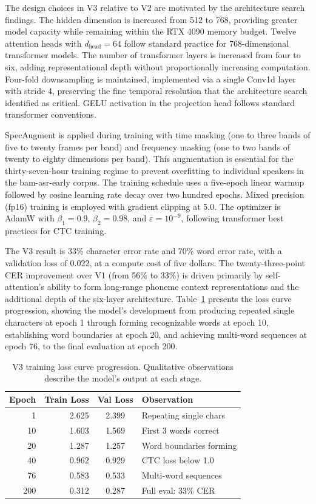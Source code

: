 \documentclass[11pt]{article}
\begin{document}
The design choices in V3 relative to V2 are motivated by the architecture search findings. The hidden dimension is increased from 512 to 768, providing greater model capacity while remaining within the RTX 4090 memory budget. Twelve attention heads with $d_{\text{head}} = 64$ follow standard practice for 768-dimensional transformer models. The number of transformer layers is increased from four to six, adding representational depth without proportionally increasing computation. Four-fold downsampling is maintained, implemented via a single Conv1d layer with stride 4, preserving the fine temporal resolution that the architecture search identified as critical. GELU activation in the projection head follows standard transformer conventions.

SpecAugment \cite{park2019specaugment} is applied during training with time masking (one to three bands of five to twenty frames per band) and frequency masking (one to two bands of twenty to eighty dimensions per band). This augmentation is essential for the thirty-seven-hour training regime to prevent overfitting to individual speakers in the bam-asr-early corpus. The training schedule uses a five-epoch linear warmup followed by cosine learning rate decay over two hundred epochs. Mixed precision (fp16) training is employed with gradient clipping at 5.0. The optimizer is AdamW with $\beta_1 = 0.9$, $\beta_2 = 0.98$, and $\varepsilon = 10^{-9}$, following transformer best practices for CTC training.

The V3 result is 33\% character error rate and 70\% word error rate, with a validation loss of 0.022, at a compute cost of five dollars. The twenty-three-point CER improvement over V1 (from 56\% to 33\%) is driven primarily by self-attention's ability to form long-range phoneme context representations and the additional depth of the six-layer architecture. Table~\ref{tab:loss_curve} presents the loss curve progression, showing the model's development from producing repeated single characters at epoch 1 through forming recognizable words at epoch 10, establishing word boundaries at epoch 20, and achieving multi-word sequences at epoch 76, to the final evaluation at epoch 200.

\begin{table}[t]
\centering
\small
\caption{V3 training loss curve progression. Qualitative observations describe the model's output at each stage.}
\label{tab:loss_curve}
\begin{tabular}{@{}rrcl@{}}
\toprule
Epoch & Train Loss & Val Loss & Observation \\
\midrule
1 & 2.625 & 2.399 & Repeating single chars \\
10 & 1.603 & 1.569 & First 3 words correct \\
20 & 1.287 & 1.257 & Word boundaries forming \\
40 & 0.962 & 0.929 & CTC loss below 1.0 \\
76 & 0.583 & 0.533 & Multi-word sequences \\
200 & 0.312 & 0.287 & Full eval: 33\% CER \\
\bottomrule
\end{tabular}
\end{table}
\end{document}
